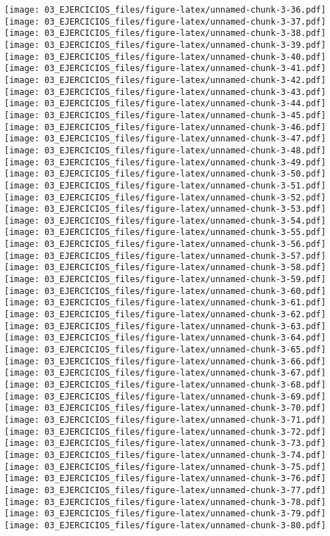 \documentclass[
]{book}
\begin{document}
\texttt{[image: 03\_EJERCICIOS\_files/figure-latex/unnamed-chunk-3-36.pdf]} \texttt{[image: 03\_EJERCICIOS\_files/figure-latex/unnamed-chunk-3-37.pdf]} \texttt{[image: 03\_EJERCICIOS\_files/figure-latex/unnamed-chunk-3-38.pdf]} \texttt{[image: 03\_EJERCICIOS\_files/figure-latex/unnamed-chunk-3-39.pdf]} \texttt{[image: 03\_EJERCICIOS\_files/figure-latex/unnamed-chunk-3-40.pdf]} \texttt{[image: 03\_EJERCICIOS\_files/figure-latex/unnamed-chunk-3-41.pdf]} \texttt{[image: 03\_EJERCICIOS\_files/figure-latex/unnamed-chunk-3-42.pdf]} \texttt{[image: 03\_EJERCICIOS\_files/figure-latex/unnamed-chunk-3-43.pdf]} \texttt{[image: 03\_EJERCICIOS\_files/figure-latex/unnamed-chunk-3-44.pdf]} \texttt{[image: 03\_EJERCICIOS\_files/figure-latex/unnamed-chunk-3-45.pdf]} \texttt{[image: 03\_EJERCICIOS\_files/figure-latex/unnamed-chunk-3-46.pdf]} \texttt{[image: 03\_EJERCICIOS\_files/figure-latex/unnamed-chunk-3-47.pdf]} \texttt{[image: 03\_EJERCICIOS\_files/figure-latex/unnamed-chunk-3-48.pdf]} \texttt{[image: 03\_EJERCICIOS\_files/figure-latex/unnamed-chunk-3-49.pdf]} \texttt{[image: 03\_EJERCICIOS\_files/figure-latex/unnamed-chunk-3-50.pdf]} \texttt{[image: 03\_EJERCICIOS\_files/figure-latex/unnamed-chunk-3-51.pdf]} \texttt{[image: 03\_EJERCICIOS\_files/figure-latex/unnamed-chunk-3-52.pdf]} \texttt{[image: 03\_EJERCICIOS\_files/figure-latex/unnamed-chunk-3-53.pdf]} \texttt{[image: 03\_EJERCICIOS\_files/figure-latex/unnamed-chunk-3-54.pdf]} \texttt{[image: 03\_EJERCICIOS\_files/figure-latex/unnamed-chunk-3-55.pdf]} \texttt{[image: 03\_EJERCICIOS\_files/figure-latex/unnamed-chunk-3-56.pdf]} \texttt{[image: 03\_EJERCICIOS\_files/figure-latex/unnamed-chunk-3-57.pdf]} \texttt{[image: 03\_EJERCICIOS\_files/figure-latex/unnamed-chunk-3-58.pdf]} \texttt{[image: 03\_EJERCICIOS\_files/figure-latex/unnamed-chunk-3-59.pdf]} \texttt{[image: 03\_EJERCICIOS\_files/figure-latex/unnamed-chunk-3-60.pdf]} \texttt{[image: 03\_EJERCICIOS\_files/figure-latex/unnamed-chunk-3-61.pdf]} \texttt{[image: 03\_EJERCICIOS\_files/figure-latex/unnamed-chunk-3-62.pdf]} \texttt{[image: 03\_EJERCICIOS\_files/figure-latex/unnamed-chunk-3-63.pdf]} \texttt{[image: 03\_EJERCICIOS\_files/figure-latex/unnamed-chunk-3-64.pdf]} \texttt{[image: 03\_EJERCICIOS\_files/figure-latex/unnamed-chunk-3-65.pdf]} \texttt{[image: 03\_EJERCICIOS\_files/figure-latex/unnamed-chunk-3-66.pdf]} \texttt{[image: 03\_EJERCICIOS\_files/figure-latex/unnamed-chunk-3-67.pdf]} \texttt{[image: 03\_EJERCICIOS\_files/figure-latex/unnamed-chunk-3-68.pdf]} \texttt{[image: 03\_EJERCICIOS\_files/figure-latex/unnamed-chunk-3-69.pdf]} \texttt{[image: 03\_EJERCICIOS\_files/figure-latex/unnamed-chunk-3-70.pdf]} \texttt{[image: 03\_EJERCICIOS\_files/figure-latex/unnamed-chunk-3-71.pdf]} \texttt{[image: 03\_EJERCICIOS\_files/figure-latex/unnamed-chunk-3-72.pdf]} \texttt{[image: 03\_EJERCICIOS\_files/figure-latex/unnamed-chunk-3-73.pdf]} \texttt{[image: 03\_EJERCICIOS\_files/figure-latex/unnamed-chunk-3-74.pdf]} \texttt{[image: 03\_EJERCICIOS\_files/figure-latex/unnamed-chunk-3-75.pdf]} \texttt{[image: 03\_EJERCICIOS\_files/figure-latex/unnamed-chunk-3-76.pdf]} \texttt{[image: 03\_EJERCICIOS\_files/figure-latex/unnamed-chunk-3-77.pdf]} \texttt{[image: 03\_EJERCICIOS\_files/figure-latex/unnamed-chunk-3-78.pdf]} \texttt{[image: 03\_EJERCICIOS\_files/figure-latex/unnamed-chunk-3-79.pdf]} \texttt{[image: 03\_EJERCICIOS\_files/figure-latex/unnamed-chunk-3-80.pdf]} 
\end{document}
